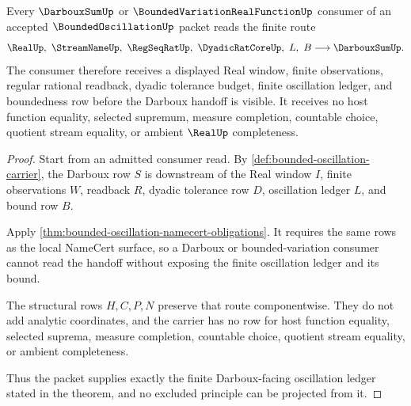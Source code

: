 \begin{theorem}
\label{thm:bounded-oscillation-darboux-handoff}
Every $\DarbouxSumUp$ or $\BoundedVariationRealFunctionUp$ consumer of an accepted $\BoundedOscillationUp$ packet reads the finite route
$$
\RealUp,\ \StreamNameUp,\ \RegSeqRatUp,\ \DyadicRatCoreUp,\ L,\ B \longrightarrow \DarbouxSumUp .
$$
The consumer therefore receives a displayed Real window, finite observations, regular rational readback, dyadic tolerance budget, finite oscillation ledger, and boundedness row before the Darboux handoff is visible. It receives no host function equality, selected supremum, measure completion, countable choice, quotient stream equality, or ambient $\RealUp$ completeness.
\end{theorem}
\begin{proof}
Start from an admitted consumer read. By \autoref{def:bounded-oscillation-carrier}, the Darboux row $S$ is downstream of the Real window $I$, finite observations $W$, readback $R$, dyadic tolerance row $D$, oscillation ledger $L$, and bound row $B$.

Apply \autoref{thm:bounded-oscillation-namecert-obligations}. It requires the same rows as the local NameCert surface, so a Darboux or bounded-variation consumer cannot read the handoff without exposing the finite oscillation ledger and its bound.

The structural rows $H,C,P,N$ preserve that route componentwise. They do not add analytic coordinates, and the carrier has no row for host function equality, selected suprema, measure completion, countable choice, quotient stream equality, or ambient completeness.

Thus the packet supplies exactly the finite Darboux-facing oscillation ledger stated in the theorem, and no excluded principle can be projected from it.
\end{proof}

